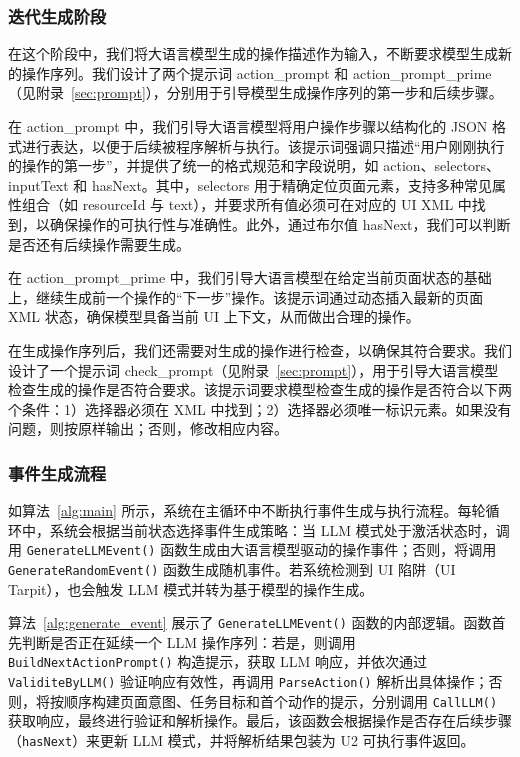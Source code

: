\documentclass[twocolumn, 10pt]{article}
\begin{document}
\subsubsection{迭代生成阶段}
\label{sec:iterative_generate}

在这个阶段中，我们将大语言模型生成的操作描述作为输入，不断要求模型生成新的操作序列。我们设计了两个提示词 action\_prompt 和 action\_prompt\_prime（见附录~\ref{sec:prompt}），分别用于引导模型生成操作序列的第一步和后续步骤。

在 action\_prompt 中，我们引导大语言模型将用户操作步骤以结构化的 JSON 格式进行表达，以便于后续被程序解析与执行。该提示词强调只描述“用户刚刚执行的操作的第一步”，并提供了统一的格式规范和字段说明，如 action、selectors、inputText 和 hasNext。其中，selectors 用于精确定位页面元素，支持多种常见属性组合（如 resourceId 与 text），并要求所有值必须可在对应的 UI XML 中找到，以确保操作的可执行性与准确性。此外，通过布尔值 hasNext，我们可以判断是否还有后续操作需要生成。

在 action\_prompt\_prime 中，我们引导大语言模型在给定当前页面状态的基础上，继续生成前一个操作的“下一步”操作。该提示词通过动态插入最新的页面 XML 状态，确保模型具备当前 UI 上下文，从而做出合理的操作。

在生成操作序列后，我们还需要对生成的操作进行检查，以确保其符合要求。我们设计了一个提示词 check\_prompt（见附录~\ref{sec:prompt}），用于引导大语言模型检查生成的操作是否符合要求。该提示词要求模型检查生成的操作是否符合以下两个条件：1）选择器必须在 XML 中找到；2）选择器必须唯一标识元素。如果没有问题，则按原样输出；否则，修改相应内容。

\subsubsection{事件生成流程}
\label{sec:generate_event}

如算法~\ref{alg:main} 所示，系统在主循环中不断执行事件生成与执行流程。每轮循环中，系统会根据当前状态选择事件生成策略：当 LLM 模式处于激活状态时，调用 \texttt{GenerateLLMEvent()} 函数生成由大语言模型驱动的操作事件；否则，将调用 \texttt{GenerateRandomEvent()} 函数生成随机事件。若系统检测到 UI 陷阱（UI Tarpit），也会触发 LLM 模式并转为基于模型的操作生成。

算法~\ref{alg:generate_event} 展示了 \texttt{GenerateLLMEvent()} 函数的内部逻辑。函数首先判断是否正在延续一个 LLM 操作序列：若是，则调用 \texttt{BuildNextActionPrompt()} 构造提示，获取 LLM 响应，并依次通过 \texttt{ValiditeByLLM()} 验证响应有效性，再调用 \texttt{ParseAction()} 解析出具体操作；否则，将按顺序构建页面意图、任务目标和首个动作的提示，分别调用 \texttt{CallLLM()} 获取响应，最终进行验证和解析操作。最后，该函数会根据操作是否存在后续步骤（\texttt{hasNext}）来更新 LLM 模式，并将解析结果包装为 U2 可执行事件返回。
\end{document}
